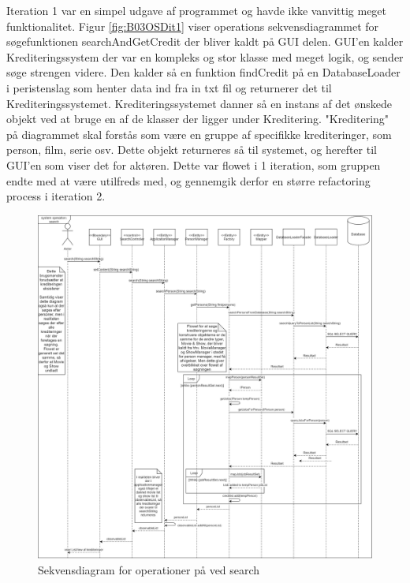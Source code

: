 Iteration 1 var en simpel udgave af programmet og havde ikke vanvittig meget funktionalitet. Figur \ref{fig:B03OSDit1} viser operations sekvensdiagrammet for søgefunktionen searchAndGetCredit der bliver kaldt på GUI delen. GUI'en kalder Krediteringssystem der var en kompleks og stor klasse med meget logik, og sender søge strengen videre. Den kalder så en funktion findCredit på en DatabaseLoader i peristenslag som henter data ind fra in txt fil og returnerer det til Krediteringssystemet. Krediteringssystemet danner så en instans af det ønskede objekt ved at bruge en af de klasser der ligger under Kreditering. "Kreditering" på diagrammet skal forstås som være en gruppe af specifikke krediteringer, som person, film, serie osv. Dette objekt returneres så til systemet, og herefter til GUI'en som viser det for aktøren.
Dette var flowet i 1 iteration, som gruppen endte med at være utilfreds med, og gennemgik derfor en større refactoring process i iteration 2.



\begin{figure}[H]
\centerline{\includegraphics[width = 195mm]{images/B03OSD.png}}
    \caption{Sekvensdiagram for operationer på ved search}
    \label{fig:OperationsSekvensdiagramSearch}
\end{figure}

